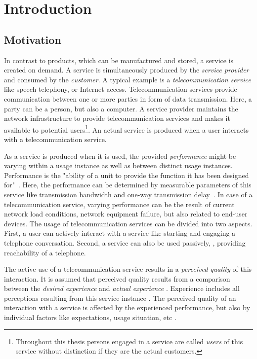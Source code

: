 \chapter{Introduction}\label{chap:01}

\section{Motivation}
In contrast to products, which can be manufactured and stored, a service is created on demand.
A service is simultaneously produced by the \emph{service provider} and consumed by the \emph{customer}.
A typical example is a \emph{telecommunication service} like speech telephony, or Internet access.
Telecommunication services provide communication between one or more parties in form of data transmission.
Here, a party can be a person, but also a computer.
A service provider maintains the network infrastructure to provide telecommunication services and makes it available to potential users\footnote{Throughout this thesis persons engaged in a service are called \emph{users} of this service without distinction if they are the actual customers.}.
An actual service is produced when a user interacts with a telecommunication service.

As a service is produced when it is used, the provided \emph{performance} might be varying within a usage instance as well as between distinct usage instances.
Performance is the "ability of a unit to provide the function it has been designed for"~\citep[][p.~360]{moller_quality_2005}.
Here, the performance can be determined by measurable parameters of this service like transmission bandwidth and one-way transmission delay~\citep[][p.~12]{moller_assessment_2000}.
In case of a telecommunication service, varying performance can be the result of current network load conditions, network equipment failure, but also related to end-user devices.
The usage of telecommunication services can be divided into two aspects.
First, a user can actively interact with a service like starting and engaging a telephone conversation.
Second, a service can also be used passively, \eg, providing reachability of a telephone.

The active use of a telecommunication service results in a \emph{perceived quality} of this interaction.
It is assumed that perceived quality results from a comparison between the \emph{desired experience} and \emph{actual experience} \citep[][p.~13]{raake_quality_2014}. %
Experience includes all perceptions resulting from this service instance \citep[][p.~13]{raake_quality_2014}.
The perceived quality of an interaction with a service is affected by the experienced performance, but also by individual factors like expectations, usage situation, etc \citep[\eg,][p.~55ff.]{reiter_factors_2014}.

